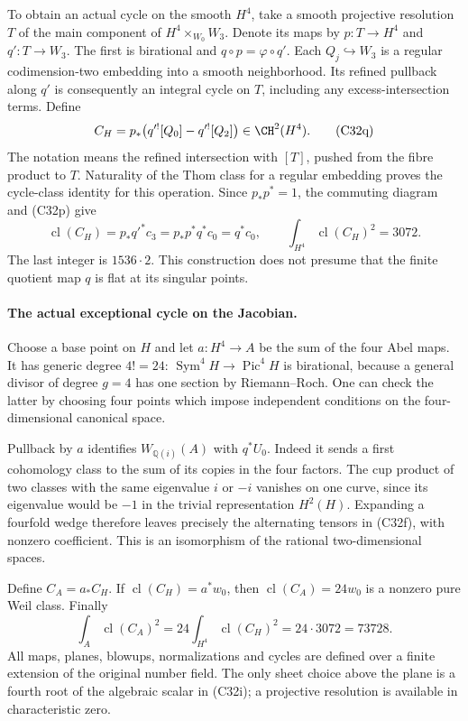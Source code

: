 \documentclass[11pt]{article}
\newcommand{\Q}{\mathbb Q}\newcommand{\C}{\mathbb C}\newcommand{\Z}{\mathbb Z}\newcommand{\R}{\mathbb R}\newcommand{\A}{\mathbb A}\newcommand{\OO}{\mathcal O}
\theoremstyle{definition}\newtheorem{definition}[theorem]{Definition}\newtheorem{remark}[theorem]{Remark}
\begin{document}
To obtain an actual cycle on the smooth
$H^4$, take a smooth projective resolution
$T$ of the main component of
$H^4\times_{W_0}W_3$.  Denote its maps by
$p:T\to H^4$ and $q':T\to W_3$.
The first is birational and
$q\circ p=\varphi\circ q'$.
Each $Q_j\hookrightarrow W_3$ is a regular
codimension-two embedding into a smooth
neighborhood.  Its refined pullback along
$q'$ is consequently an integral cycle on
$T$, including any excess-intersection
terms.  Define
\[
 C_H=p_*\bigl(q'^![Q_0]-q'^![Q_2]\bigr)\in\CH^2(H^4).
                                                        \tag{C32q}
\]
The notation means the refined intersection
with $[T]$, pushed from the fibre product
to $T$.  Naturality of the Thom class for
a regular embedding proves the cycle-class
identity for this operation.  Since
$p_*p^*=1$, the commuting diagram and
(C32p) give
\[
 \operatorname{cl}(C_H)=p_*q'^*c_3
                      =p_*p^*q^*c_0=q^*c_0,
 \qquad
              \int_{H^4}\operatorname{cl}(C_H)^2=3072.
                                                        \tag{C32r}
\]
The last integer is $1536\cdot2$.
This construction does not presume that the
finite quotient map $q$ is flat at its
singular points.

\paragraph{The actual exceptional cycle on the Jacobian.}
Choose a base point on $H$ and let
$a:H^4\to A$ be the sum of the four Abel
maps.  It has generic degree $4!=24$:
$\operatorname{Sym}^4H\to\operatorname{Pic}^4H$
is birational, because a general divisor of
degree $g=4$ has one section by Riemann--Roch.
One can check the latter by choosing four
points which impose independent conditions
on the four-dimensional canonical space.

Pullback by $a$ identifies $W_{\Q(i)}(A)$
with $q^*U_0$.  Indeed it sends a first
cohomology class to the sum of its copies
in the four factors.  The cup product of
two classes with the same eigenvalue $i$
or $-i$ vanishes on one curve, since its
eigenvalue would be $-1$ in the trivial
representation $H^2(H)$.  Expanding a
fourfold wedge therefore leaves precisely
the alternating tensors in (C32f), with
nonzero coefficient.  This is an isomorphism
of the rational two-dimensional spaces.

Define $C_A=a_*C_H$.  If
$\operatorname{cl}(C_H)=a^*w_0$, then
$\operatorname{cl}(C_A)=24w_0$ is a nonzero
pure Weil class.  Finally
\[
 \int_A\operatorname{cl}(C_A)^2
   =24\int_{H^4}\operatorname{cl}(C_H)^2
   =24\cdot3072=73728.
                                                        \tag{C32s}
\]
All maps, planes, blowups, normalizations
and cycles are defined over a finite
extension of the original number field.
The only sheet choice above the plane
is a fourth root of the algebraic scalar
in (C32i); a projective resolution is
available in characteristic zero.
\end{document}
